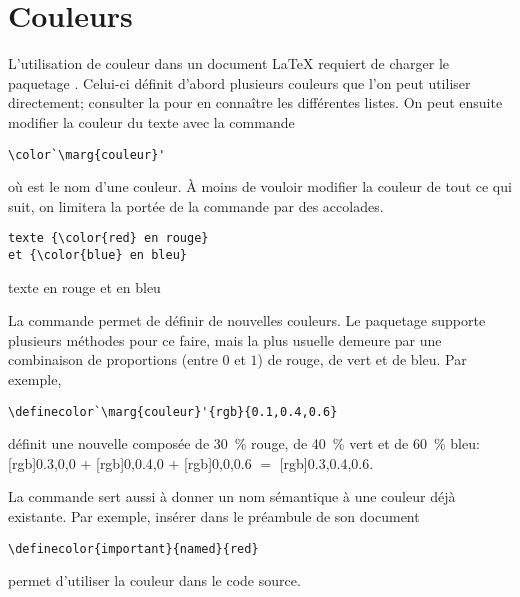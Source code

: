\section{Couleurs}

L'utilisation de couleur dans un document {\LaTeX} requiert de charger
le paquetage  \citep{xcolor}. Celui-ci définit d'abord
plusieurs couleurs que l'on peut utiliser directement; consulter la %
pour en connaître les différentes listes. On peut ensuite modifier la
couleur du texte avec la commande
\begin{lstlisting}
\color`\marg{couleur}'
\end{lstlisting}
où  est le nom d'une couleur. À moins de vouloir
modifier la couleur de tout ce qui suit, on limitera la portée de la
commande par des accolades.
\begin{demo}
  \begin{texample}
\begin{lstlisting}
texte {\color{red} en rouge}
et {\color{blue} en bleu}
\end{lstlisting}
  \producing
  texte {\color{red} en rouge} et {\color{blue} en bleu}
  \end{texample}
\end{demo}

La commande \cmd{\definecolor} permet de définir de nouvelles
couleurs. Le paquetage  supporte plusieurs méthodes pour
ce faire, mais la plus usuelle demeure par une combinaison de
proportions (entre $0$ et $1$) de rouge, de vert et de bleu. Par
exemple,
\begin{lstlisting}
\definecolor`\marg{couleur}'{rgb}{0.1,0.4,0.6}
\end{lstlisting}
définit une nouvelle  composée de 30~\% rouge, de 40~\%
vert et de 60~\% bleu: %
[rgb]{0.3,0,0}{\phantom{xx}} $+$ %
[rgb]{0,0.4,0}{\phantom{xx}} $+$ %
[rgb]{0,0,0.6}{\phantom{xx}} $=$ %
[rgb]{0.3,0.4,0.6}{\phantom{xx}}.

La commande \cmd{\definecolor} sert aussi à donner un nom sémantique à
une couleur déjà existante. Par exemple, insérer dans le préambule de
son document
\begin{lstlisting}
\definecolor{important}{named}{red}
\end{lstlisting}
permet d'utiliser la couleur  dans le code source.




